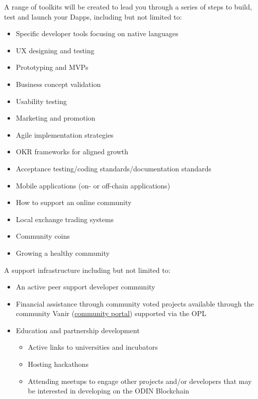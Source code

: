 \documentclass[12pt,letterpaper]{article}
\begin{document}
A range of toolkits will be created to lead you through a series of steps to build, test and launch your Dapps, including but not limited to:
\begin{itemize}
   \item Specific developer tools focusing on native languages
   \item UX designing and testing
   \item Prototyping and MVPs
   \item Business concept validation 
   \item Usability testing
   \item Marketing and promotion
   \item Agile implementation strategies
   \item OKR frameworks for aligned growth
   \item Acceptance testing/coding standards/documentation standards
   \item Mobile applications (on- or off-chain applications)
   \item How to support an online community
   \item Local exchange trading systems
   \item Community coins
   \item Growing a healthy community
\end{itemize}

A support infrastructure including but not limited to:
\begin{itemize}
   \item An active peer support developer community
   \item Financial assistance through community voted projects available through the community Vanir (\href{https://docs.google.com/document/d/15YAuXnc-3y06keG302AfK-6QCZ7PkonSIGuMRxncdcw/edit?disco=AAAACD6XbTI&ts=5b47a26b#heading=h.c0p3cw59hwku}{community portal}) supported via the OPL
   \item Education and partnership development
   \begin{itemize}
      \item Active links to universities and incubators
      \item Hosting hackathons
      \item Attending meetups to engage other projects and/or developers that may be interested in developing on the ODIN Blockchain
   \end{itemize}
\end{itemize}
\end{document}
